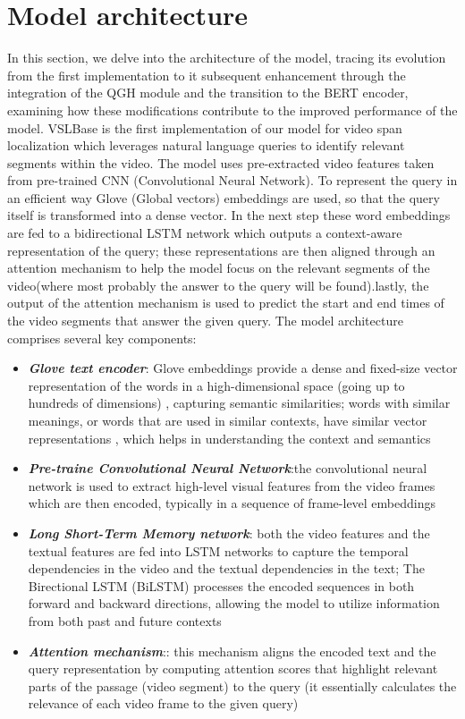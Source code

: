 \documentclass[conference]{IEEEtran}
\begin{document}
\section{Model architecture}
In this section, we delve into the architecture of the model, tracing its evolution from the first implementation to it subsequent enhancement through the integration of the QGH module and the transition to the BERT encoder, examining how these modifications contribute to the improved performance of the model.
VSLBase is the first implementation of our model for video span localization which leverages natural language queries to identify relevant segments within the video.
The model uses pre-extracted video features taken from pre-trained CNN (Convolutional Neural Network). To represent the query in an efficient way  Glove (Global vectors) embeddings are used,  so that the query itself is transformed into a dense vector. In the next step these word embeddings are fed to a bidirectional  LSTM network which outputs a context-aware representation of the query; these representations are then aligned through an attention mechanism to help the model focus on the relevant segments of the video(where most probably the answer to the query will be found).lastly, the output of the attention mechanism is used to predict the start and end times of the video segments that answer the given query. 
The model architecture comprises several key components: 
\begin{itemize}
 \item \textit{\textbf{Glove text encoder}}: Glove embeddings provide a dense  and fixed-size vector representation of the words in a high-dimensional space (going up to hundreds of dimensions) , capturing semantic similarities; words with similar meanings, or words that are used in similar contexts, have similar vector representations , which helps in understanding the context and semantics 
 \item \textit{\textbf{Pre-traine Convolutional Neural Network}}:the convolutional neural network is used to extract  high-level visual features from the video frames which are then encoded, typically in a sequence of frame-level embeddings  
 \item \textit{\textbf{Long Short-Term Memory network}}: both the video features and the textual features are fed into LSTM networks to capture the temporal dependencies in the video and the textual dependencies in the text; The Birectional LSTM (BiLSTM) processes the encoded sequences in both forward and backward directions, allowing the model to utilize information from both past and future contexts
 \item \textit{\textbf{Attention mechanism}}:: this mechanism aligns the encoded text and the query representation by computing attention scores that highlight relevant parts of the passage (video segment) to the query (it essentially calculates the relevance of each video frame to the given query) 
 
\end{itemize}
\end{document}
